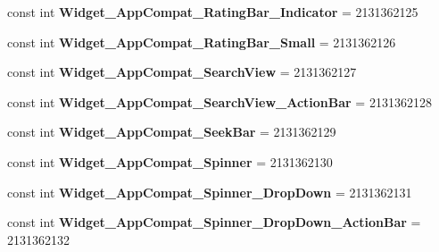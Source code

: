 \begin{DoxyCompactItemize}
const int {\bfseries Widget\+\_\+\+App\+Compat\+\_\+\+Rating\+Bar\+\_\+\+Indicator} = 2131362125
\item 
\mbox{\label{class_pinned_app_1_1_droid_1_1_resource_1_1_style_a14454d86db89a17aaab52a5838f139c0}} 
const int {\bfseries Widget\+\_\+\+App\+Compat\+\_\+\+Rating\+Bar\+\_\+\+Small} = 2131362126
\item 
\mbox{\label{class_pinned_app_1_1_droid_1_1_resource_1_1_style_a65ae23cacb018bdd6d23388a716e3b40}} 
const int {\bfseries Widget\+\_\+\+App\+Compat\+\_\+\+Search\+View} = 2131362127
\item 
\mbox{\label{class_pinned_app_1_1_droid_1_1_resource_1_1_style_aa7a5b17beb81b85b80c9a40f7dbe1e8f}} 
const int {\bfseries Widget\+\_\+\+App\+Compat\+\_\+\+Search\+View\+\_\+\+Action\+Bar} = 2131362128
\item 
\mbox{\label{class_pinned_app_1_1_droid_1_1_resource_1_1_style_a75c3ed4f8736b0cba60b7cdc1de6f28c}} 
const int {\bfseries Widget\+\_\+\+App\+Compat\+\_\+\+Seek\+Bar} = 2131362129
\item 
\mbox{\label{class_pinned_app_1_1_droid_1_1_resource_1_1_style_a4f012cdf6c3a873ef7bc97adcad77151}} 
const int {\bfseries Widget\+\_\+\+App\+Compat\+\_\+\+Spinner} = 2131362130
\item 
\mbox{\label{class_pinned_app_1_1_droid_1_1_resource_1_1_style_a975997f6206fa9ae4c3c44c79626d667}} 
const int {\bfseries Widget\+\_\+\+App\+Compat\+\_\+\+Spinner\+\_\+\+Drop\+Down} = 2131362131
\item 
\mbox{\label{class_pinned_app_1_1_droid_1_1_resource_1_1_style_a30583faac99a9168a4c42358b53ac43b}} 
const int {\bfseries Widget\+\_\+\+App\+Compat\+\_\+\+Spinner\+\_\+\+Drop\+Down\+\_\+\+Action\+Bar} = 2131362132
\item 
\mbox{\label{class_pinned_app_1_1_droid_1_1_resource_1_1_style_a6ebe57128cc6fde44423198773987532}} 

\end{DoxyCompactItemize}
